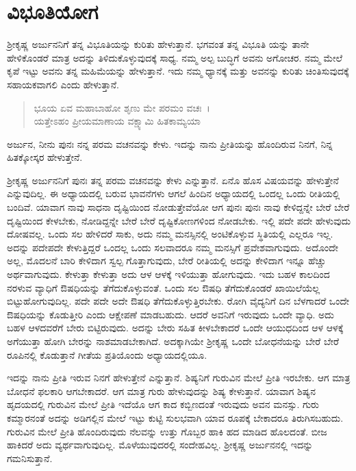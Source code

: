 
\chapter{ವಿಭೂತಿಯೋಗ}

ಶ‍್ರೀಕೃಷ್ಣ ಅರ್ಜುನನಿಗೆ ತನ್ನ ವಿಭೂತಿಯನ್ನು ಕುರಿತು ಹೇಳುತ್ತಾನೆ. ಭಗವಂತ ತನ್ನ ವಿಭೂತಿ ಯನ್ನು ತಾನೇ ಹೇಳಿಕೊಂಡರೆ ಮಾತ್ರ ಅದನ್ನು ತಿಳಿದುಕೊಳ್ಳುವುದಕ್ಕೆ ಸಾಧ್ಯ. ನಮ್ಮ ಅಲ್ಪ ಬುದ್ಧಿಗೆ ಅವನು ಅಗೋಚರ. ನಮ್ಮ ಮೇಲೆ ಕೃಪೆ ಇಟ್ಟು ಅವನು ತನ್ನ ಮಹಿಮೆಯನ್ನು ಹೇಳುತ್ತಾನೆ. ಇದು ನಮ್ಮ ಧ್ಯಾನಕ್ಕೆ ಮತ್ತು ಅವನನ್ನು ಕುರಿತು ಚಿಂತಿಸುವುದಕ್ಕೆ ಸಹಾಯಕವಾಗಲಿ ಎಂದು ಹೇಳುತ್ತಾನೆ.

\begin{verse}
ಭೂಯ ಏವ ಮಹಾಬಾಹೋ ಶೃಣು ಮೇ ಪರಮಂ ವಚಃ~।\\ಯತ್ತೇಽಹಂ ಪ್ರೀಯಮಾಣಾಯ ವಕ್ಷ್ಯಾಮಿ ಹಿತಕಾಮ್ಯಯಾ 
\end{verse}

{\small ಅರ್ಜುನ, ನೀನು ಪುನಃ ನನ್ನ ಪರಮ ವಚನವನ್ನು ಕೇಳು. ಇದನ್ನು ನಾನು ಪ್ರೀತಿಯನ್ನು ಹೊಂದಿರುವ ನಿನಗೆ, ನಿನ್ನ ಹಿತಕ್ಕೋಸ್ಕರ ಹೇಳುತ್ತೇನೆ.}

ಶ‍್ರೀಕೃಷ್ಣ ಅರ್ಜುನನಿಗೆ ಪುನಃ ತನ್ನ ಪರಮ ವಚನವನ್ನು ಕೇಳು ಎನ್ನುತ್ತಾನೆ. ಏನೊ ಹೊಸ ವಿಷಯವನ್ನು ಹೇಳುತ್ತೇನೆ ಎನ್ನುವುದಿಲ್ಲ. ಈ ಅಧ್ಯಾಯದಲ್ಲಿ ಬರುವ ಭಾವನೆಗಳು ಆಗಲೆ ಹಿಂದಿನ ಅಧ್ಯಾಯದಲ್ಲಿ ಒಂದಲ್ಲ ಒಂದು ರೀತಿಯಲ್ಲಿ ಬಂದಿವೆ. ಯಾವಾಗ ನಾವು ಸಾಧನಾ ದೃಷ್ಟಿಯಿಂದ ನೋಡುತ್ತೇವೆಯೋ ಆಗ ಪುನಃ ಪುನಃ ನಾವು ಕೇಳಿದ್ದನ್ನೇ ಬೇರೆ ಬೇರೆ ದೃಷ್ಟಿಯಿಂದ ಕೇಳಬೇಕು, ನೋಡಿದ್ದನ್ನೇ ಬೇರೆ ಬೇರೆ ದೃಷ್ಟಿಕೋಣಗಳಿಂದ ನೋಡಬೇಕು. ಇಲ್ಲಿ ಪದೇ ಪದೇ ಹೇಳುವುದು ದೋಷವಲ್ಲ. ಒಂದು ಸಲ ಹೇಳಿದರೆ ಸಾಕು, ಅದು ನಮ್ಮ ಮನಸ್ಸಿನಲ್ಲಿ ಅಂಟಿಕೊಳ್ಳುವ ಸ್ಥಿತಿಯಲ್ಲಿ ಎಲ್ಲರೂ ಇಲ್ಲ. ಅದನ್ನು ಪದೇಪದೇ ಕೇಳುತ್ತಿದ್ದರೆ ಒಂದಲ್ಲ ಒಂದು ಸಲವಾದರೂ ನಮ್ಮ ಮನಸ್ಸಿಗೆ ಪ್ರವೇಶವಾಗುವುದು. ಅದೊಂದೇ ಅಲ್ಲ, ಮೊದಲನೆ ಬಾರಿ ಕೇಳಿದಾಗ ಸ್ವಲ್ಪ ಗೊತ್ತಾಗುವುದು, ಬೇರೆ ರೀತಿಯಲ್ಲಿ ಅದನ್ನು ಕೇಳಿದಾಗ ಇನ್ನೂ ಹೆಚ್ಚು ಅರ್ಥವಾಗುವುದು. ಕೇಳುತ್ತಾ ಕೇಳುತ್ತಾ ಅದು ಆಳ ಆಳಕ್ಕೆ ಇಳಿಯುತ್ತಾ ಹೋಗುವುದು. ಇದು ಬಹಳ ಕಾಲದಿಂದ ನರಳುವ ವ್ಯಾಧಿಗೆ ಔಷಧಿಯನ್ನು ತೆಗೆದುಕೊಳ್ಳುವಂತೆ. ಒಂದು ಸಲ ಔಷಧಿ ತೆಗೆದುಕೊಂಡರೆ ಖಾಯಿಲೆಯೆಲ್ಲ ಬಿಟ್ಟುಹೋಗುವುದಿಲ್ಲ. ಪದೇ ಪದೇ ಅದೇ ಔಷಧಿ ತೆಗೆದುಕೊಳ್ಳುತ್ತಿರಬೇಕು. ರೋಗಿ ವೈದ್ಯನಿಗೆ ದಿನ ಬೆಳಗಾದರೆ ಒಂದೇ ಔಷಧಿಯನ್ನು ಕೊಡುತ್ತೀರಿ ಎಂದು ಆಕ್ಷೇಪಣೆ ಮಾಡಬಹುದು. ಆದರೆ ಅವನಿಗೆ ಇರುವುದು ಒಂದೇ ವ್ಯಾಧಿ. ಅದು ಬಹಳ ಆಳದವರೆಗೆ ಬೇರು ಬಿಟ್ಟಿರುವುದು. ಅದನ್ನು ಬೇರು ಸಹಿತ ಕೀಳಬೇಕಾದರೆ ಒಂದೇ ಆಯುಧದಿಂದ ಆಳ ಆಳಕ್ಕೆ ಅಗೆಯುತ್ತಾ ಹೋಗಿ ಬೇರನ್ನು ನಾಶಮಾಡಬೇಕಾಗಿದೆ. ಅದಕ್ಕಾಗಿಯೇ ಶ‍್ರೀಕೃಷ್ಣ ಒಂದೇ ಬೋಧನೆಯನ್ನು ಬೇರೆ ಬೇರೆ ರೂಪಿನಲ್ಲಿ ಕೊಡುತ್ತಾನೆ ಗೀತೆಯ ಪ್ರತಿಯೊಂದು ಅಧ್ಯಾಯದಲ್ಲಿಯೂ.

ಇದನ್ನು ನಾನು ಪ್ರೀತಿ ಇರುವ ನಿನಗೆ ಹೇಳುತ್ತೇನೆ ಎನ್ನುತ್ತಾನೆ. ಶಿಷ್ಯನಿಗೆ ಗುರುವಿನ ಮೇಲೆ ಪ್ರೀತಿ ಇರಬೇಕು. ಆಗ ಮಾತ್ರ ಬೋಧನೆ ಫಲಕಾರಿ ಆಗಬೇಕಾದರೆ. ಆಗ ಮಾತ್ರ ಗುರು ಹೇಳುವುದನ್ನು ಶಿಷ್ಯ ಕೇಳುತ್ತಾನೆ. ಯಾವಾಗ ಶಿಷ್ಯನ ಹೃದಯದಲ್ಲಿ ಗುರುವಿನ ಮೇಲೆ ಪ್ರೀತಿ ಇದೆಯೊ ಆಗ ಕಾದ ಕಬ್ಬಿಣದಂತೆ ಇರುವುದು ಅವನ ಮನಸ್ಸು. ಗುರು ಕಮ್ಮಾರನಂತೆ ಅದನ್ನು ಅಡಿಗಲ್ಲಿನ ಮೇಲೆ ಇಟ್ಟು ಕುಟ್ಟಿ ಸುಲಭವಾಗಿ ಯಾವ ರೂಪಕ್ಕೆ ಬೇಕಾದರೂ ತಿರುಗಿಸಬಹುದು. ಗುರುವಿನ ಮೇಲೆ ಪ್ರೀತಿ ಹೊಂದಿರುವುದು ನೆಲವನ್ನು ಉತ್ತು ಗೊಬ್ಬರ ಹಾಕಿ ಹದ ಮಾಡಿದ ಹೊಲದಂತೆ. ಬೀಜ ಹಾಕಿದರೆ ಅದು ವ್ಯರ್ಥವಾಗುವುದಿಲ್ಲ. ಮೊಳೆಯುವುದರಲ್ಲಿ ಸಂದೇಹವಿಲ್ಲ. ಶ‍್ರೀಕೃಷ್ಣ ಅರ್ಜುನನಲ್ಲಿ ಇದನ್ನು ಗಮನಿಸುತ್ತಾನೆ.

